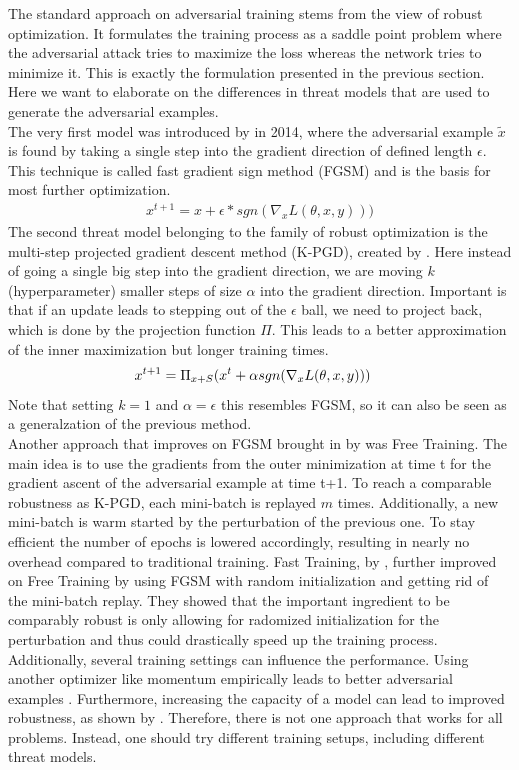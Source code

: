\documentclass{article}
\begin{document}
The standard approach on adversarial training stems from the view of robust optimization. It formulates the training process as a saddle point problem where the adversarial attack tries to maximize the loss whereas the network tries to minimize it. This is exactly the formulation presented in the previous section. Here we want to elaborate on the differences in threat models that are used to generate the adversarial examples. \\
The very first model was introduced by \cite{b9} in 2014, where the adversarial example $\tilde{x}$ is found by taking a single step into the gradient direction of defined length $\epsilon$. This technique is called fast gradient sign method (FGSM) and is the basis for most further optimization.
\begin{align*}
  x^{t+1} = x + \epsilon * sgn(\nabla_x L(\theta,x,y)))
\end{align*}
The second threat model belonging to the family of robust optimization is the multi-step projected gradient descent method (K-PGD), created by \cite{b28}. Here instead of going a single big step into the gradient direction, we are moving $k$ (hyperparameter) smaller steps of size $\alpha$ into the gradient direction. Important is that if an update leads to stepping out of the $\epsilon$ ball, we need to project back, which is done by the projection function $\Pi$. This leads to a better approximation of the inner maximization but longer training times. 
\begin{align*}
    x^{t+1} &= \Pi_{x+S} (x^t + \alpha \space sgn(\nabla_x L(\theta,x,y)))
\end{align*}
Note that setting $k=1$ and $\alpha=\epsilon$ this resembles FGSM, so it can also be seen as a generalzation of the previous method. \\
Another approach that improves on FGSM brought in by \cite{b5} was Free Training. The main idea is to use the gradients from the outer minimization at time t for the gradient ascent of the adversarial example at time t+1. To reach a comparable robustness as K-PGD, each mini-batch is replayed $m$ times. Additionally, a new mini-batch is warm started by the perturbation of the previous one. To stay efficient the number of epochs is lowered accordingly, resulting in nearly no overhead compared to traditional training.
Fast Training, by \cite{b3}, further improved on Free Training by using FGSM with random initialization and getting rid of the mini-batch replay. They showed that the important ingredient to be comparably robust is only allowing for radomized initialization for the perturbation and thus could drastically speed up the training process. \\
Additionally, several training settings can influence the performance. Using another optimizer like momentum empirically leads to better adversarial examples \cite{b29}. Furthermore, increasing the capacity of a model can lead to improved robustness, as shown by \cite{b2}. Therefore, there is not one approach that works for all problems. Instead, one should try different training setups, including different threat models.
  
\end{document}
